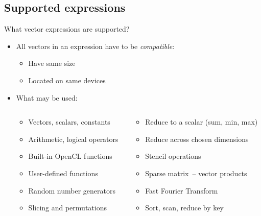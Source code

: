 \documentclass[@BEAMER_OPTIONS@]{beamer}
\begin{document}
\subsection{Supported expressions}
\begin{frame}[fragile]{What vector expressions are supported?}
    \begin{itemize}
        \item All vectors in an expression have to be \emph{compatible}:
            \begin{itemize}
                \item Have same size
                \item Located on same devices
            \end{itemize}
        \item What may be used:
            \begin{columns}
                \begin{column}{0.4\textwidth}
                    \begin{itemize}
                        \item Vectors, scalars, constants
                        \item Arithmetic, logical operators
                        \item Built-in OpenCL functions
                        \item User-defined functions
                        \item Random number generators
                        \item Slicing and permutations
                    \end{itemize}
                \end{column}
                \begin{column}{0.42\textwidth}
                    \begin{itemize}
                        \item Reduce to a scalar (sum, min, max)
                        \item Reduce across chosen dimensions
                        \item Stencil operations
                        \item Sparse matrix~-- vector products
                        \item Fast Fourier Transform
                        \item Sort, scan, reduce by key
                    \end{itemize}
                \end{column}
            \end{columns}
    \end{itemize}
\end{frame}
\end{document}
